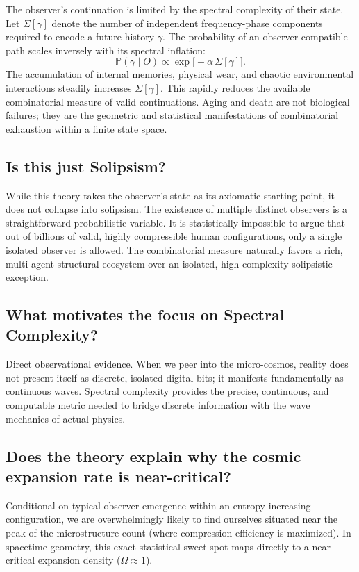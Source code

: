 The observer’s continuation is limited by the spectral complexity of their state.
Let $\Sigma[\gamma]$ denote the number of independent frequency-phase components required to encode a future history $\gamma$.
The probability of an observer-compatible path scales inversely with its spectral inflation:
\[
\mathbb{P}(\gamma \mid O) \propto \exp\bigl[-\alpha \, \Sigma[\gamma]\bigr].
\]
The accumulation of internal memories, physical wear, and chaotic environmental interactions steadily increases $\Sigma[\gamma]$.
This rapidly reduces the available combinatorial measure of valid continuations.
Aging and death are not biological failures; they are the geometric and statistical manifestations of combinatorial exhaustion within a finite state space.


\subsection*{Is this just Solipsism?}

While this theory takes the observer's state as its axiomatic starting point, it does not collapse into solipsism.
The existence of multiple distinct observers is a straightforward probabilistic variable.
It is statistically impossible to argue that out of billions of valid, highly compressible human configurations, only a single isolated observer is allowed.
The combinatorial measure naturally favors a rich, multi-agent structural ecosystem over an isolated, high-complexity solipsistic exception.


\subsection*{What motivates the focus on Spectral Complexity?}

Direct observational evidence. When we peer into the micro-cosmos, reality does not present itself as discrete, isolated digital bits;
it manifests fundamentally as continuous waves.
Spectral complexity provides the precise, continuous, and computable metric needed to bridge discrete information with the wave mechanics of actual physics.


\subsection*{Does the theory explain why the cosmic expansion rate is near-critical?}

Conditional on typical observer emergence within an entropy-increasing configuration, we are overwhelmingly likely to find ourselves situated near the peak of the microstructure count (where compression efficiency is maximized).
In spacetime geometry, this exact statistical sweet spot maps directly to a near-critical expansion density ($\Omega \approx 1$).
